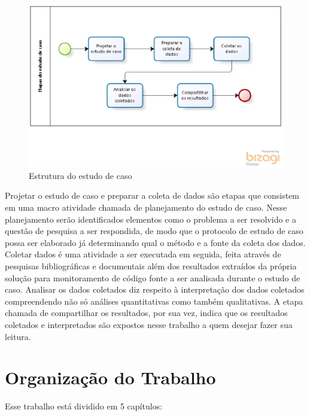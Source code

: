 \begin{figure}[h!]
\centering
\includegraphics[keepaspectratio=false,scale=0.8]{figuras/figuras_matheus/estudodecaso.eps}
\caption{Estrutura do estudo de caso}
\label{fig:estudodecaso}
\end{figure}
\FloatBarrier

Projetar o estudo de caso e preparar a coleta de dados são etapas que consistem em uma macro atividade chamada de planejamento do estudo de caso. Nesse planejamento serão identificados elementos como o problema a ser resolvido e a questão de pesquisa a ser respondida, de modo que o protocolo de estudo de caso possa ser elaborado já determinando qual o método e a fonte da coleta dos dados. Coletar dados é uma atividade a ser executada em seguida, feita através de pesquisas bibliográficas e documentais além dos resultados extraídos da própria solução para monitoramento de código fonte a ser analisada durante o estudo de caso. Analisar os dados coletados diz respeito à interpretação dos dados coletados compreendendo não só análises quantitativas como também qualitativas. A etapa chamada de compartilhar os resultados, por sua vez, indica que os resultados coletados e interpretados são expostos nesse trabalho a quem desejar fazer sua leitura. 


\section{Organização do Trabalho}

Esse trabalho está dividido em 5 capítulos:

